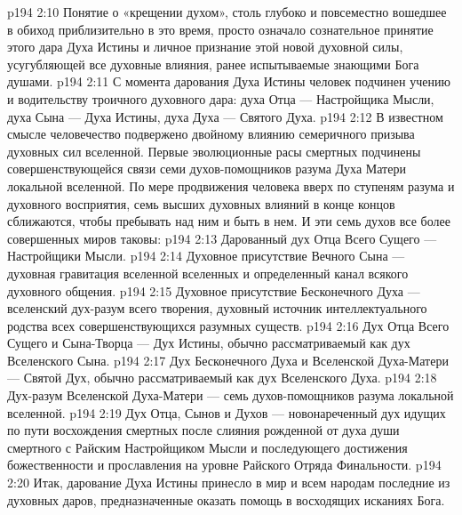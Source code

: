 \vs p194 2:10 \pc Понятие о «крещении духом», столь глубоко и повсеместно вошедшее в обиход приблизительно в это время, просто означало сознательное принятие этого дара Духа Истины и личное признание этой новой духовной силы, усугубляющей все духовные влияния, ранее испытываемые знающими Бога душами.
\vs p194 2:11 \pc С момента дарования Духа Истины человек подчинен учению и водительству троичного духовного дара: духа Отца --- Настройщика Мысли, духа Сына --- Духа Истины, духа Духа --- Святого Духа.
\vs p194 2:12 В известном смысле человечество подвержено двойному влиянию семеричного призыва духовных сил вселенной. Первые эволюционные расы смертных подчинены совершенствующейся связи семи духов\hyp{}помощников разума Духа Матери локальной вселенной. По мере продвижения человека вверх по ступеням разума и духовного восприятия, семь высших духовных влияний в конце концов сближаются, чтобы пребывать над ним и быть в нем. И эти семь духов все более совершенных миров таковы:
\vs p194 2:13 \bibnobreakspace Дарованный дух Отца Всего Сущего --- Настройщики Мысли.
\vs p194 2:14 \bibnobreakspace Духовное присутствие Вечного Сына --- духовная гравитация вселенной вселенных и определенный канал всякого духовного общения.
\vs p194 2:15 \bibnobreakspace Духовное присутствие Бесконечного Духа --- вселенский дух\hyp{}разум всего творения, духовный источник интеллектуального родства всех совершенствующихся разумных существ.
\vs p194 2:16 \bibnobreakspace Дух Отца Всего Сущего и Сына\hyp{}Творца --- Дух Истины, обычно рассматриваемый как дух Вселенского Сына.
\vs p194 2:17 \bibnobreakspace Дух Бесконечного Духа и Вселенской Духа\hyp{}Матери --- Святой Дух, обычно рассматриваемый как дух Вселенского Духа.
\vs p194 2:18 \bibnobreakspace Дух\hyp{}разум Вселенской Духа\hyp{}Матери --- семь духов\hyp{}помощников разума локальной вселенной.
\vs p194 2:19 \bibnobreakspace Дух Отца, Сынов и Духов --- новонареченный дух идущих по пути восхождения смертных после слияния рожденной от духа души смертного с Райским Настройщиком Мысли и последующего достижения божественности и прославления на уровне Райского Отряда Финальности.
\vs p194 2:20 \pc Итак, дарование Духа Истины принесло в мир и всем народам последние из духовных даров, предназначенные оказать помощь в восходящих исканиях Бога.
